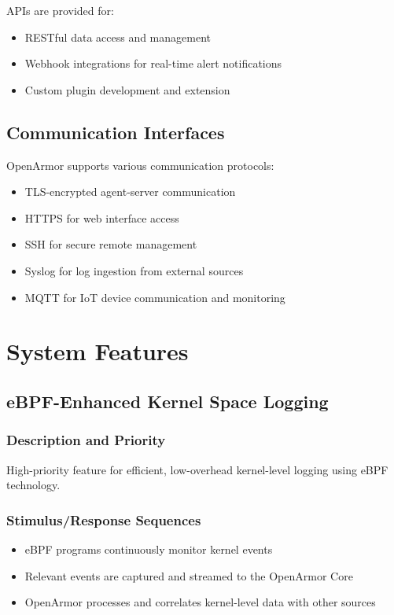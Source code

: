 APIs are provided for:
\begin{itemize}
    \item RESTful data access and management
    \item Webhook integrations for real-time alert notifications
    \item Custom plugin development and extension
\end{itemize}

\subsection{Communication Interfaces}
OpenArmor supports various communication protocols:

\begin{itemize}
    \item TLS-encrypted agent-server communication
    \item HTTPS for web interface access
    \item SSH for secure remote management
    \item Syslog for log ingestion from external sources
    \item MQTT for IoT device communication and monitoring
\end{itemize}

\section{System Features}

\subsection{eBPF-Enhanced Kernel Space Logging}
\subsubsection{Description and Priority}
High-priority feature for efficient, low-overhead kernel-level logging using eBPF technology.

\subsubsection{Stimulus/Response Sequences}
\begin{itemize}
    \item eBPF programs continuously monitor kernel events
    \item Relevant events are captured and streamed to the OpenArmor Core
    \item OpenArmor processes and correlates kernel-level data with other sources
\end{itemize}

